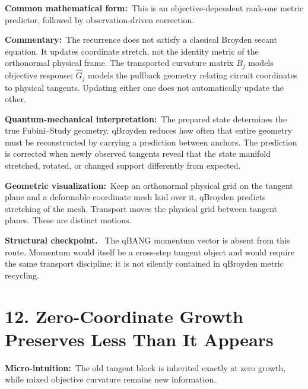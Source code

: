 \documentclass[10pt,twocolumn]{article}
\newcommand{\micro}[1]{\par\noindent\textbf{Micro-intuition:}\ #1\par}
\newcommand{\form}[1]{\par\noindent\textbf{Common mathematical form:}\ #1\par}
\newcommand{\commentary}[1]{\par\noindent\textbf{Commentary:}\ #1\par}
\newcommand{\phys}[1]{\par\noindent\textbf{Quantum-mechanical interpretation:}\ #1\par}
\newcommand{\geom}[1]{\par\noindent\textbf{Geometric visualization:}\ \textcolor{teal!70!black}{#1}\par}
\newcommand{\conceptbreak}{\par\medskip\noindent{\color{black!30}\rule{\columnwidth}{0.35pt}}\par\medskip}
\newenvironment{insight}{\begin{center}\begin{minipage}{0.94\columnwidth}\color{blue!35!black}\textbf{Structural checkpoint.}\ }{\end{minipage}\end{center}}
\begin{document}
\form{This is an objective-dependent rank-one metric predictor, followed by
observation-driven correction.}

\commentary{The recurrence does not satisfy a classical Broyden secant equation.
It updates coordinate stretch, not the identity metric of the orthonormal
physical frame. The transported curvature matrix \(B_j\) models objective
response; \(\widehat G_j\) models the pullback geometry relating circuit
coordinates to physical tangents. Updating either one does not automatically
update the other.}

\phys{The prepared state determines the true Fubini--Study geometry. qBroyden
reduces how often that entire geometry must be reconstructed by carrying a
prediction between anchors. The prediction is corrected when newly observed
tangents reveal that the state manifold stretched, rotated, or changed support
differently from expected.}

\geom{Keep an orthonormal physical grid on the tangent plane and a deformable
coordinate mesh laid over it. qBroyden predicts stretching of the mesh.
Transport moves the physical grid between tangent planes. These are distinct
motions.}

\begin{insight}
The qBANG momentum vector is absent from this route. Momentum would itself be a
cross-step tangent object and would require the same transport discipline; it
is not silently contained in qBroyden metric recycling.
\end{insight}

\conceptbreak

\section*{12. Zero-Coordinate Growth Preserves Less Than It Appears}

\micro{The old tangent block is inherited exactly at zero growth, while mixed
objective curvature remains new information.}
\end{document}
